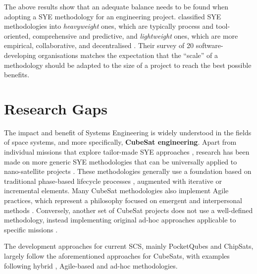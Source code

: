 \documentclass[a4paper,nobib,justified,final]{tufte-book}
\begin{document}
The above results show that an adequate balance needs to be found when adopting a \acl{SYE} methodology for an engineering project. \citeauthor{akbarStatisticalAnalysisEffects2018} classified \acs{SYE} methodologies into \emph{heavyweight} ones, which are typically process and tool-oriented, comprehensive and predictive, and \emph{lightweight} ones, which are more empirical, collaborative, and decentralised \autocite{akbarStatisticalAnalysisEffects2018}. Their survey of 20 software-developing organisations matches the expectation that the ``scale'' of a methodology should be adapted to the size of a project to reach the best possible benefits.

\FloatBarrier
\section{Research Gaps}
\label{sec:INTRODUCTION_research_gaps}

The impact and benefit of Systems Engineering is widely understood in the fields of space systems, and more specifically, \textbf{CubeSat engineering}. Apart from individual missions that explore tailor-made \acl{SYE} approaches \cite{cappaertBuildingDeployingOperating2018,chaiebOpenOrbiterCubeSatSystemofsystems2015,dallmannAgileSpaceParadigm2015,lillAgileMissionOperations2018,lubian-arenillasNanosatelliteDevelopmentMethodology2019,segretPavingStonesInitial2014}, research has been made on more generic \acs{SYE} methodologies that can be universally applied to nano-satellite projects \autocite{alanaziEngineeringMethodologyStudentDriven2019,deckerSystemsengineeringAssessmentMultiple2016}. These methodologies generally use a foundation based on traditional phase-based lifecycle processes \cite{sheaNASASystemsEngineering2020}, augmented with iterative or incremental elements. Many CubeSat methodologies also implement Agile practices, which represent a philosophy focused on emergent and interpersonal methods \autocite{beckAgileManifesto2001}. Conversely, another set of CubeSat projects does not use a well-defined methodology, instead implementing original ad-hoc approaches applicable to specific missions \autocite{cheongRobustFrameworkLowCost2020}.

The development approaches for current \acf{SCS}, mainly PocketQubes and ChipSats, largely follow the aforementioned approaches for CubeSats, with examples following hybrid \autocite{cappellettiHandsSpaceEducational2020}, Agile-based \autocite{sperettaCubeSatsPocketQubesOpportunities2016} and ad-hoc \autocite{manchesterCentimeterScaleSpacecraftDesign2015,daradimosQUBIK1pPocketQube2024} methodologies.
\end{document}
